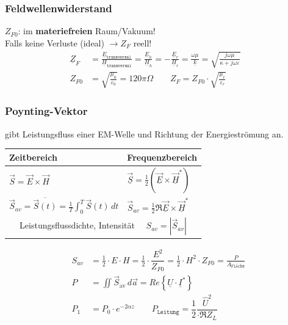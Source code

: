 \subsubsection{Feldwellenwiderstand}
$ Z_{F0} $: im \textbf{materiefreien} Raum/Vakuum!\\
Falls keine Verluste (ideal) $ \rightarrow Z_F $ reell!
\begin{align*}
	\underline{Z}_F & = \frac{\underline{E}_{\texttt{transversal}}}{\underline{H}_{\texttt{transversal}}} = \frac{\underline{E}_h}{\underline{H}_h} = -\frac{\underline{E}_r}{\underline{H}_r} = \frac{\omega \mu}{\underline{k}} = \sqrt{\frac{j\omega\mu}{\kappa+j \omega \varepsilon}}   \\
	Z_{F0}          & = \sqrt{\frac{\mu_0}{\varepsilon_0}} = 120\pi \Omega \qquad  Z_F = Z_{F0} \cdot \sqrt{\frac{\mu_r}{\varepsilon_r}}                                                                                                                                                  &
\end{align*}
\subsubsection{Poynting-Vektor}
gibt Leistungsfluss einer EM-Welle und Richtung der Energieströmung an.\\
\begin{tabular}{|l|l|}
	\hline
	Zeitbereich                                                                        & Frequenzbereich                                                                        \\
	\hline
	$\vec{S} = \vec{E} \times \vec{H}$                                                 & $\vec{\underline{S}} = \frac{1}{2} (\underline{\vec{E}} \times \underline{\vec{H}}^*)$ \\
	$\vec{S}_{av} = \overline{\vec{S}(t)} = \frac{1}{T} \int_{0}^{T} \vec{S}(t) \,dt $ & $\vec{S}_{av} = \frac{1}{2} \Re{\underline{\vec{E}} \times \underline{\vec{H}}^*}$     \\
	\hline
	\multicolumn{2}{|c|}{Leistungsflussdichte, Intensität $\quad S_{av} = |\vec{S}_{av}|$}                                                                                      \\
	\hline
\end{tabular}
\begin{align*}
	S_{av} & =  \frac{1}{2} \cdot E \cdot H
	=  \frac{1}{2} \cdot \dfrac{E^2}{Z_{F0}}
	=  \frac{1}{2} \cdot H^2 \cdot Z_{F0}
	=  \frac{P}{A_\texttt{Fläche}}                                                                                   \\
	P      & = \iint\vec{S}_{\text{av}}\, d\vec{a}
	= Re\left\{\underline{U}\cdot\underline{I}^*\right\}                                                             \\
	P_1    & = P_0 \cdot e^{-2\alpha z} \qquad P_{\texttt{Leitung}} = \dfrac{1}{2} \dfrac{\hat{U}^2}{\cdot \Re{Z_L}}
\end{align*}

